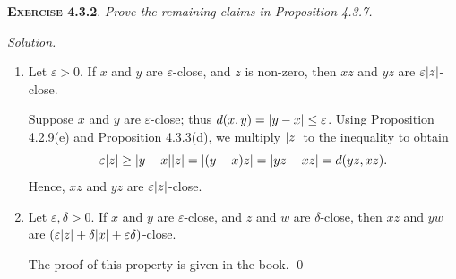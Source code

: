 \documentclass[12pt]{article}
\theoremstyle{remark}
\newenvironment{exer}[2]{
    \noindent \setlength{\parskip}{1em}%
    \textsc{\textbf{Exercise #1}}. \textit{#2} \par
    \noindent \textit{Solution.} %
}{\bigskip}
\begin{document}
\begin{exer}{4.3.2}{
    Prove the remaining claims in Proposition 4.3.7.
}
\begin{enumerate}[topsep=0mm,label=(\alph*)]
        \item Let $\varepsilon > 0$. If $x$ and $y$ are $\varepsilon$-close, and $z$ is non-zero, then $xz$ and $yz$ are $\varepsilon\abs{z}$-close.

            Suppose $x$ and $y$ are $\varepsilon$-close; thus $d(x, y) = \abs{y - x} \le \varepsilon$.
            Using Proposition 4.2.9(e) and Proposition 4.3.3(d), we multiply $\abs{z}$ to the inequality to obtain
            \[
                \varepsilon\abs{z} \ge \abs{y - x}\abs{z} = \abs{(y - x)z} = \abs{yz - xz} = d(yz, xz).
            \]
            Hence, $xz$ and $yz$ are $\varepsilon\abs{z}$-close.

        \item Let $\varepsilon, \delta > 0$. If $x$ and $y$ are $\varepsilon$-close, and $z$ and $w$ are $\delta$-close, then $xz$ and $yw$ are $(\varepsilon\abs{z} + \delta\abs{x} + \varepsilon\delta)$-close.

            The proof of this property is given in the book. \qed
    \end{enumerate}
\end{exer}
\end{document}
